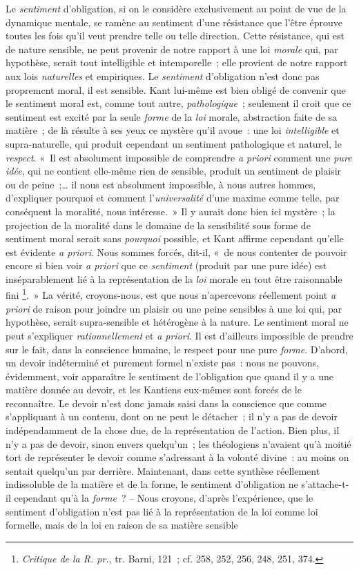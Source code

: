 \documentclass[french,twoside]{book} %
\begin{document}
Le \emph{sentiment} d’obligation, si on le considère exclusivement au point de vue de la dynamique mentale, se ramène au sentiment d’une résistance que l’être éprouve toutes les fois qu’il veut prendre telle ou telle direction. Cette résistance, qui est de nature sensible, ne peut provenir de notre rapport à une loi \emph{morale} qui, par hypothèse, serait tout intelligible et intemporelle ; elle provient de notre rapport aux lois \emph{naturelles} et empiriques. Le \emph{sentiment} d’obligation n’est donc pas propremcnt moral, il est sensible. Kant lui-même est bien obligé de convenir que le sentiment moral est, comme tout autre, \emph{pathologique} ; seulement il croit que ce sentiment est excité par la seule \emph{forme} de la \emph{loi} morale, abstraction faite de sa matière ; de là résulte à ses yeux ce mystère qu’il avoue : une loi \emph{intelligible} et supra-naturelle, qui produit cependant un sentiment pathologique et naturel, le \emph{respect}. « Il est absolument impossible de comprendre \emph{a priori} comment une \emph{pure idée}, qui ne contient elle-même rien de sensible, produit un sentiment de plaisir ou de peine ;… il nous est absolument impossible, à nous autres hommes, d’expliquer pourquoi et comment l’\emph{universalité} d’une maxime comme telle, par conséquent la moralité, nous intéresse. » Il y aurait donc bien ici mystère ; la projection de la moralité dans le domaine de la sensibilité sous forme de sentiment moral serait sans \emph{pourquoi} possible, et Kant affirme cependant qu’elle est évidente \emph{a priori}. Nous sommes forcés, dit-il, « de nous contenter de pouvoir encore si bien voir \emph{a priori} que ce \emph{sentiment} (produit par une pure idée) est inséparablement lié à la représentation de la \emph{loi} morale en tout être raisonnable fini \footnote{\emph{Critique de la R. pr.}, tr. Barni, 121 ; cf. 258, 252, 256, 248, 251, 374.}. » La vérité, croyons-nous, est que nous n’apercevons réellement point \emph{a priori} de raison pour joindre un plaisir ou une peine sensibles à une loi qui, par hypothèse, serait supra-sensible et hétérogène à la nature. Le sentiment moral ne peut s’expliquer \emph{rationnellement} et \emph{a priori}. Il est d’ailleurs impossible de prendre sur le fait, dans la conscience humaine, le respect pour une pure \emph{forme}. D’abord, un devoir indéterminé et purement formel n’existe pas : nous ne pouvons, évidemment, voir apparaître le sentiment de l’obligation que quand il y a une matière donnée au devoir, et les Kantiens eux-mêmes sont forcés de le reconnaître. Le devoir n’est donc jamais saisi dans la conscience que comme s’appliquant à un contenu, dont on ne peut le détacher ; il n’y a pas de devoir indépendamment de la chose due, de la représentation de l’action. Bien plus, il n’y a pas de devoir, sinon envers quelqu’un ; les théologiens n’avaient qu’à moitié tort de représenter le devoir comme s’adressant à la volonté divine : au moins on sentait quelqu’un par derrière. Maintenant, dans cette synthèse réellement indissoluble de la matière et de la forme, le sentiment d’obligation ne s’attache-t-il cependant qu’à la \emph{forme} ? – Nous croyons, d’après l’expérience, que le sentiment d’obligation n’est pas lié à la représentation de la loi comme loi formelle, mais de la loi en raison de sa matière sensible 
\end{document}
